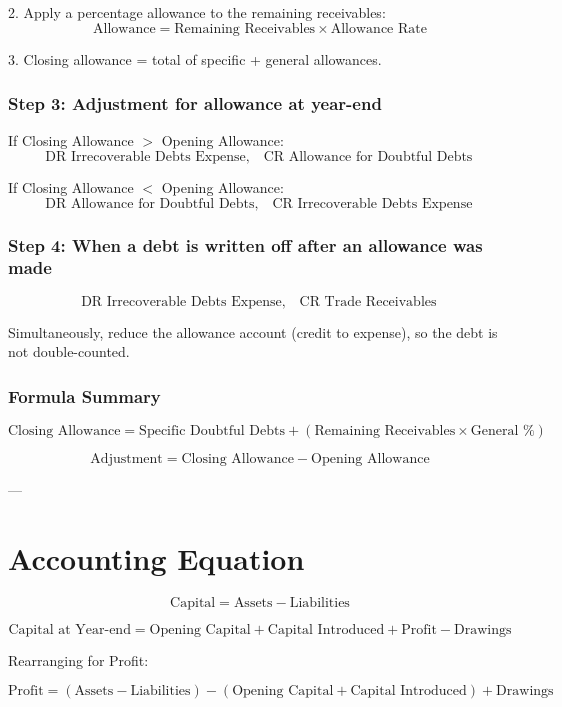 2. Apply a percentage allowance to the remaining receivables:
\[
\text{Allowance} = \text{Remaining Receivables} \times \text{Allowance Rate}
\]

3. Closing allowance = total of specific + general allowances.

\subsubsection{Step 3: Adjustment for allowance at year-end}

If Closing Allowance $>$ Opening Allowance:
\[
\text{DR Irrecoverable Debts Expense}, \quad \text{CR Allowance for Doubtful Debts}
\]

If Closing Allowance $<$ Opening Allowance:
\[
\text{DR Allowance for Doubtful Debts}, \quad \text{CR Irrecoverable Debts Expense}
\]

\subsubsection{Step 4: When a debt is written off after an allowance was made}

\[
\text{DR Irrecoverable Debts Expense}, \quad \text{CR Trade Receivables}
\]

Simultaneously, reduce the allowance account (credit to expense), so the debt is not double-counted.

\subsubsection{Formula Summary}

\[
\text{Closing Allowance} = \text{Specific Doubtful Debts} + (\text{Remaining Receivables} \times \text{General \%})
\]

\[
\text{Adjustment} = \text{Closing Allowance} - \text{Opening Allowance}
\]

---

\section{Accounting Equation}

\[
\text{Capital} = \text{Assets} - \text{Liabilities}
\]

\[
\text{Capital at Year-end} = \text{Opening Capital} + \text{Capital Introduced} + \text{Profit} - \text{Drawings}
\]

Rearranging for Profit:

\[
\text{Profit} = (\text{Assets} - \text{Liabilities}) - (\text{Opening Capital} + \text{Capital Introduced}) + \text{Drawings}
\]

